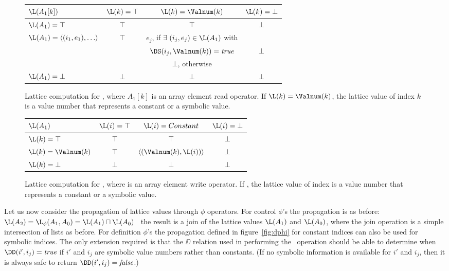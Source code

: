 \begin{figure}%
\begin{center}
\begin{tabular}{|l||c|c|c|}
\hline
$\L(A_1[k])$ & $\L(k) = \top$ & $\L(k) = \Valnum(k)$ & $\L(k) = \bot$ \\
\hline \hline
$\L(A_1) = \top$ & $\top$ & $\top$ & $\bot$ \\
\hline
$\L(A_1) = \langle (i_1,e_1), \ldots \rangle$ & $\top$ & $e_j$, 
if $\exists$
$(i_j,e_j) \in \L(A_1)$ with &\\
& & $\DS(i_j, \Valnum(k)) = \mbox{\it true}$ & $\bot$\\
& & $\bot$, otherwise & \\
\hline
$\L(A_1) = \bot$ & $\bot$ & $\bot$ & $\bot$ \\
\hline
\end{tabular}
\end{center}
\caption{Lattice computation for ,
where $A_1[k]$ is an 
array element read operator. If $\L(k)=\Valnum(k)$, the lattice value of index $k$ is a value number that represents a constant or a symbolic value.}
\label{fig:symb-aref}
\end{figure}

\begin{figure}%
\begin{center}
\begin{tabular}{|l||c|c|c|}
\hline
$\L(A_1)$ & $\L(i) = \top$ & $\L(i) = Constant$ & $\L(i) = \bot$ \\
\hline \hline
$\L(k) = \top$ & $\top$ & $\top$ & $\bot$ \\
\hline
$\L(k) = \Valnum(k)$ & $\top$ & $\langle(\Valnum(k),\L(i))\rangle$ & $\bot$ \\
\hline
$\L(k) = \bot$ & $\bot$ & $\bot$ & $\bot$ \\
\hline
\end{tabular}
\end{center}
\caption{Lattice computation for ,
where  is an 
array element write operator. If , the lattice value of index  is a value number that represents a constant or a symbolic value.}
\label{fig:symb-adef}
\end{figure}





Let us now consider
the propagation of lattice values through $\phi$
operators.
For control $\phi$'s the propagation is as before:
$\L(A_2) = \L_{\phi}(A_1,A_0) = \L(A_1) \sqcap
\L(A_0)$ \ie\ the result is a join of the lattice values $\L(A_1)$ and
$\L(A_0)$, where the join operation is a simple intersection of
lists as before.
For definition $\phi$'s the propagation defined in figure~\ref{fig:dphi}
for constant indices can also be
used for symbolic indices.  The only extension required is that
the $\DD$ relation used in performing
the \Update\ operation should be able to determine when
$\DD(i',i_j)=\mbox{\it true}$ if $i'$ and $i_j$ are symbolic
value numbers rather
than constants.  (If no symbolic information is available for $i'$
and $i_j$, then it is always safe
to return $\DD(i',i_j)=\mbox{\it false}$.)

